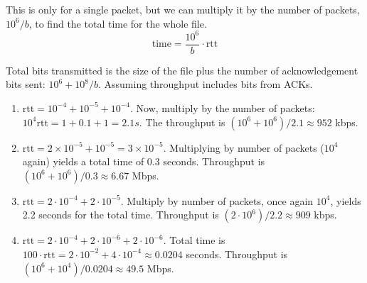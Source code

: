 \documentclass{article}
\begin{document}
This is only for a single packet, but we can multiply it by the number of
packets, $10^6 / b$, to find the total time for the whole file.
\begin{equation*}
  \text{time} = \frac{10^6}{b} \cdot \text{rtt}
\end{equation*}

Total bits transmitted is the size of the file plus the number of
acknowledgement bits sent: $10^6 + 10^8/b$. Assuming throughput includes bits
from ACKs.

\begin{enumerate}[label={\bf (\alph*)}]

  \item $\text{rtt} = 10^{-4} + 10^{-5} + 10^{-4}$.
    Now, multiply by the number of packets: $10^4 \text{rtt} = 1 + 0.1 +
    1 = 2.1 s$. The throughput is $(10^6 + 10^6) / 2.1 \approx 952$ kbps.
  \item $\text{rtt} = 2\times 10^{-5} + 10^{-5} = 3\times 10^{-5}$. Multiplying
    by number of packets ($10^4$ again) yields a total time of 0.3 seconds.
    Throughput is $(10^6 + 10^6) / 0.3 \approx 6.67$ Mbps.
  \item $\text{rtt} = 2\cdot 10^{-4} + 2\cdot 10^{-5}$. Multiply by number of
    packets, once again $10^4$, yields 2.2 seconds for the total time.
    Throughput is $(2\cdot10^6)/2.2 \approx 909$ kbps.
  \item $\text{rtt} = 2\cdot10^{-4} + 2\cdot 10^{-6} + 2\cdot 10^{-6}$. Total
    time is $100\cdot \text{rtt} = 2\cdot10^{-2} + 4\cdot10^{-4} \approx 0.0204$
    seconds. Throughput is $(10^6 + 10^4)/0.0204 \approx 49.5$ Mbps.

\end{enumerate}
\end{document}
